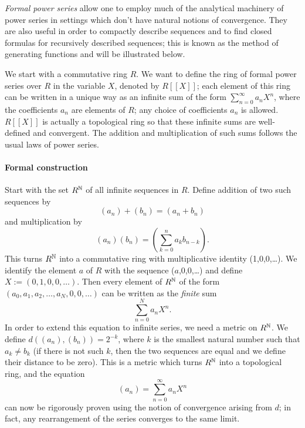 \documentclass[12pt]{article}
\begin{document}

\emph{Formal power series} allow one to employ much of the analytical
machinery of power series in settings which don't have natural notions
of convergence. They are also useful in order to compactly describe
sequences and to find closed formulas
for recursively described sequences; this is known as the method of
generating functions and will be illustrated below.

We start with a commutative ring $R$. We want to define the ring of
formal power series over $R$ in the variable $X$, denoted by $R[[X]]$;
each element of this ring can be written in a unique way as an
infinite sum of the form $\sum_{n=0}^\infty a_n X^n$, where the
coefficients $a_n$ are elements of $R$; any choice of coefficients
$a_n$ is allowed. $R[[X]]$ is actually a topological ring so that
these infinite sums are well-defined and convergent. The addition and
multiplication  of such sums follows the usual laws of power series.

\paragraph{Formal construction}

Start with the set $R^\Bbb{N}$ of all infinite sequences in $R$.
Define addition of two such sequences by 
$$(a_n) + (b_n) = (a_n + b_n)$$
and multiplication by
$$(a_n) (b_n) = (\sum_{k=0}^n a_kb_{n-k}).$$
This turns $R^\Bbb{N}$ into a commutative ring with multiplicative
identity (1,0,0,\ldots). We identify the element $a$ of $R$ with the
sequence ($a$,0,0,\ldots) and define $X:=(0,1,0,0,\ldots)$. Then every element
of $R^\Bbb{N}$ of the form $(a_0,a_1,a_2,\ldots,a_N,0,0,\ldots)$ can be written as the \emph{finite} sum
$$\sum_{n=0}^Na_n X^n.$$
In order to extend this equation to infinite series, we need a metric
on $R^\Bbb{N}$. We define $d((a_n),(b_n))=2^{-k}$, where $k$ is the
smallest natural number such that $a_k\not=b_k$ (if there is not such
$k$, then the two sequences are equal and we define their distance to
be zero). This is a metric which turns $R^\Bbb{N}$ into a topological
ring, and the equation
$$(a_n) = \sum_{n=0}^\infty a_n X^n$$
can now be rigorously proven using the notion of convergence arising
from $d$; in fact, any rearrangement of the series converges to the
same limit.
\end{document}
